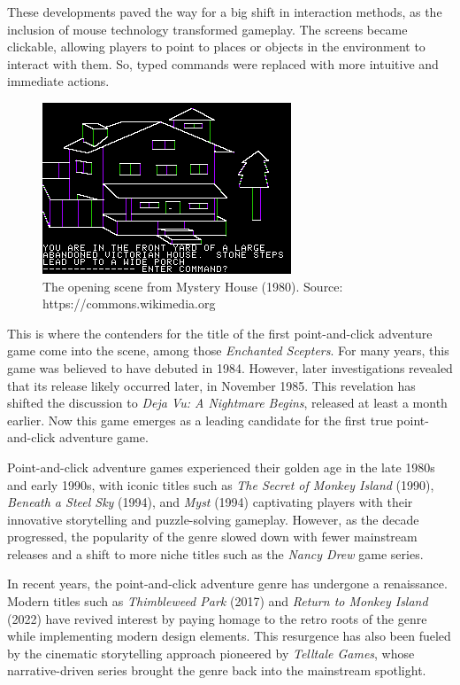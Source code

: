 These developments paved the way for a big shift in interaction methods, as the inclusion of mouse technology transformed gameplay. The screens became clickable, allowing players to point to places or objects in the environment to interact with them. So, typed commands were replaced with more intuitive and immediate actions.


\begin{figure}[H]
\centering
\includegraphics{img/Mystery_House.png}
\caption{The opening scene from Mystery House (1980). Source: https://commons.wikimedia.org\cite{wiki:MysteryHouse}}
\label{fig:MH}
\end{figure}

This is where the contenders for the title of the first point-and-click adventure game come into the scene, among those \textit{Enchanted Scepters}. For many years, this game was believed to have debuted in 1984. However, later investigations revealed that its release likely occurred later, in November 1985. This revelation has shifted the discussion to \textit{Deja Vu: A Nightmare Begins}, released at least a month earlier. Now this game emerges as a leading candidate for the first true point-and-click adventure game\cite{Pfenning2024}.

Point-and-click adventure games experienced their golden age in the late 1980s and early 1990s, with iconic titles such as \textit{The Secret of Monkey Island} (1990), \textit{Beneath a Steel Sky} (1994), and \textit{Myst} (1994) captivating players with their innovative storytelling and puzzle-solving gameplay. However, as the decade progressed, the popularity of the genre slowed down\cite{Qaffas202022} with fewer mainstream releases and a shift to more niche titles such as the \textit{Nancy Drew} game series.

In recent years, the point-and-click adventure genre has undergone a renaissance. Modern titles such as \textit{Thimbleweed Park} (2017) and \textit{Return to Monkey Island} (2022) have revived interest by paying homage to the retro roots of the genre while implementing modern design elements. This resurgence has also been fueled by the cinematic storytelling approach pioneered by \textit{Telltale Games}, whose narrative-driven series brought the genre back into the mainstream spotlight.


